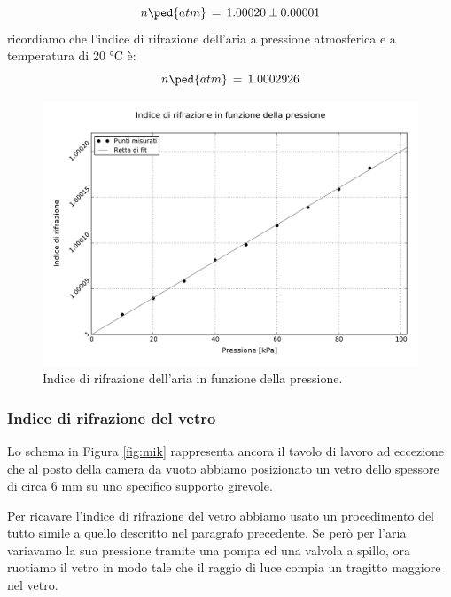 \begin{equation}
	n\ped{atm} \, = \, 1.00020 \pm 0.00001
\end{equation}
%
ricordiamo che l'indice di rifrazione dell'aria a pressione atmosferica e a temperatura di 20 $\si{\degreeCelsius}$ è:
\begin{equation}
n\ped{atm} \, = \, 1.000 292 6
\end{equation}


\begin{figure}[t]
    \centering
        \includegraphics[width=\textwidth]{graph.pdf}
        \caption{Indice di rifrazione dell'aria in funzione della pressione.}
        \label{fig:enne_press}
\end{figure}

\subsubsection{Indice di rifrazione del vetro}


Lo schema in Figura \ref{fig:mik} rappresenta ancora il tavolo di lavoro ad eccezione che al posto della camera da vuoto abbiamo posizionato un vetro dello spessore di circa 6 \si{\milli\metre} su uno specifico supporto girevole.

Per ricavare l'indice di rifrazione del vetro abbiamo usato un procedimento del tutto simile a quello descritto nel paragrafo precedente.
Se però per l'aria variavamo la sua pressione tramite una pompa ed una valvola a spillo, ora ruotiamo il vetro in modo tale che il raggio di luce compia un tragitto maggiore nel vetro. %

